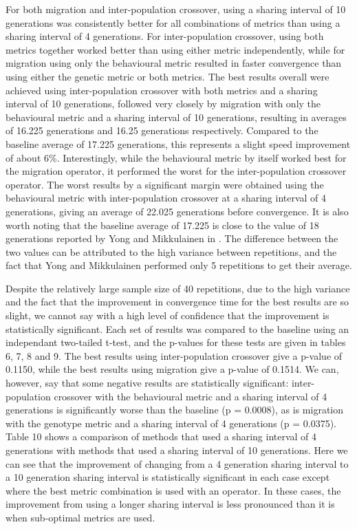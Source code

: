 \documentclass[12pt]{article} %
\begin{document}
For both migration and inter-population crossover, using a sharing interval of 10 generations was consistently better for all combinations of metrics than using a sharing interval of 4 generations. For inter-population crossover, using both metrics together worked better than using either metric independently, while for migration using only the behavioural metric resulted in faster convergence than using either the genetic metric or both metrics. The best results overall were achieved using inter-population crossover with both metrics and a sharing interval of 10 generations, followed very closely by migration with only the behavioural metric and a sharing interval of 10 generations, resulting in averages of 16.225 generations and 16.25 generations respectively. Compared to the baseline average of 17.225 generations, this represents a slight speed improvement of about 6\%. Interestingly, while the behavioural metric by itself worked best for the migration operator, it performed the worst for the inter-population crossover operator. The worst results by a significant margin were obtained using the behavioural metric with inter-population crossover at a sharing interval of 4 generations, giving an average of 22.025 generations before convergence. It is also worth noting that the baseline average of 17.225 is close to the value of 18 generations reported by Yong and Mikkulainen in \cite{Yong2001}. The difference between the two values can be attributed to the high variance between repetitions, and the fact that Yong and Mikkulainen performed only 5 repetitions to get their average.

Despite the relatively large sample size of 40 repetitions, due to the high variance and the fact that the improvement in convergence time for the best results are so slight, we cannot say with a high level of confidence that the improvement is statistically significant. Each set of results was compared to the baseline using an independant two-tailed t-test, and the p-values for these tests are given in tables 6, 7, 8 and 9. The best results using inter-population crossover give a p-value of 0.1150, while the best results using migration give a p-value of 0.1514. We can, however, say that some negative results are statistically significant: inter-population crossover with the behavioural metric and a sharing interval of 4 generations is significantly worse than the baseline (p = 0.0008), as is migration with the genotype metric and a sharing interval of 4 generations (p = 0.0375). Table 10 shows a comparison of methods that used a sharing interval of 4 generations with methods that used a sharing interval of 10 generations. Here we can see that the improvement of changing from a 4 generation sharing interval to a 10 generation sharing interval is statistically significant in each case except where the best metric combination is used with an operator. In these cases, the improvement from using a longer sharing interval is less pronounced than it is when sub-optimal metrics are used.
\end{document}
